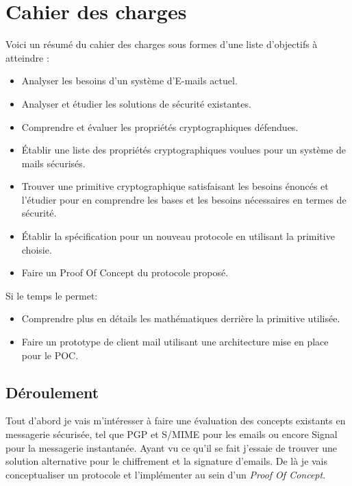 \section*{Cahier des charges}
Voici un résumé du cahier des charges sous formes d'une liste d'objectifs à atteindre :
\begin{itemize}
	\item Analyser les besoins d’un système d’E-mails actuel.
	\item Analyser et étudier les solutions de sécurité existantes.
	\item Comprendre et évaluer les propriétés cryptographiques défendues.
	\item Établir une liste des propriétés cryptographiques voulues pour un système de mails sécurisés.
	\item Trouver une primitive cryptographique satisfaisant les besoins énoncés et l’étudier pour en comprendre les bases et les besoins nécessaires en termes de sécurité.
	\item Établir la spécification pour un nouveau protocole en utilisant la primitive choisie.
	\item Faire un Proof Of Concept du protocole proposé.
\end{itemize}
Si le temps le permet: 
\begin{itemize}
	\item Comprendre plus en détails les mathématiques derrière la primitive utilisée.
	\item Faire un prototype de client mail utilisant une architecture mise en place pour le POC.
\end{itemize}


\subsection*{Déroulement}
Tout d'abord je vais m'intéresser à faire une évaluation des concepts existants en messagerie sécurisée, tel que PGP et S/MIME pour les emails ou encore Signal pour la messagerie instantanée. Ayant vu ce qu'il se fait j'essaie de trouver une solution alternative pour le chiffrement et la signature d'emails. De là je vais conceptualiser un protocole et l'implémenter au sein d'un \textit{Proof Of Concept}.
